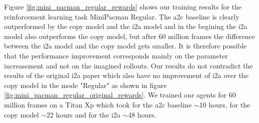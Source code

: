 Figure \ref{fig:mini_pacman_regular_rewards} shows our training results for the reinforcement learning task MiniPacman Regular.
The a2c baseline is clearly outperformed by the copy model and the i2a model and in the begining the i2a model also outperforms the copy model, but after 60 million frames the difference between the i2a model and the copy model gets smaller.
It is therefore possible that the performance improvement corresponds mainly on the parameter increasement and not on the imagined rollouts.
Our results do not contradict the results of the original i2a paper which also have no improvement of i2a over the copy model in the mode "Regular" as shown in figure \ref{fig:mini_pacman_regular_original_rewards}.
We trained our agents for 60 million frames on a Titan Xp which took for the a2c baseline $\sim$10 hours, for the copy model $\sim$22 hours and for the i2a $\sim$48 hours.


